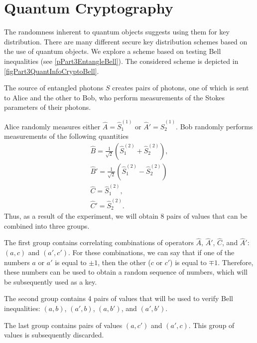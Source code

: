 \section{Quantum Cryptography}
\label{subsecPart3QuantInfoQuantCrypto}
The randomness inherent to quantum objects suggests using them for key distribution. There are many different secure key distribution schemes based on the use of quantum objects. We explore a scheme based on testing Bell inequalities (see \ref{pPart3EntangleBell}). The considered scheme is depicted in \autoref{figPart3QuantInfoCryptoBell}.



The source of entangled photons  $S$ creates pairs of photons, one of which is sent to Alice and the other to Bob, who perform measurements of the Stokes parameters of their photons.

Alice randomly measures either $\hat{A} = \hat{S}_1^{(1)}$ or $\hat{A}' = \hat{S}_2^{(1)}$. Bob randomly performs measurements of the following quantities
\begin{eqnarray}
\hat{B} = \frac{1}{\sqrt{2}}\left(\hat{S}_1^{(2)} +
  \hat{S}_2^{(2)}\right), 
\nonumber \\
\hat{B}' = \frac{1}{\sqrt{2}}\left(\hat{S}_1^{(2)} - \hat{S}_2^{(2)}\right)
\nonumber \\
\hat{C} = \hat{S}_1^{(2)},
\nonumber \\
\hat{C}' = \hat{S}_2^{(2)}.
\nonumber
\end{eqnarray}
Thus, as a result of the experiment, we will obtain 8 pairs of values that can be combined into three groups.

The first group contains correlating combinations of operators $\hat{A}$, $\hat{A}'$, $\hat{C}$, and $\hat{A}'$: $\left(a, c\right)$ and $\left(a', c'\right)$. For these combinations, we can say that if one of the numbers $a$ or $a'$ is equal to $\pm 1$, then the other ($c$ or $c'$) is equal to $\mp 1$. Therefore, these numbers can be used to obtain a random sequence of numbers, which will be subsequently used as a key.

The second group contains 4 pairs of values that will be used to verify Bell inequalities: $\left(a, b\right)$, $\left(a', b\right)$, $\left(a, b'\right)$, and $\left(a', b'\right)$.

The last group contains pairs of values $\left(a, c'\right)$ and $\left(a', c\right)$. This group of values is subsequently discarded.


